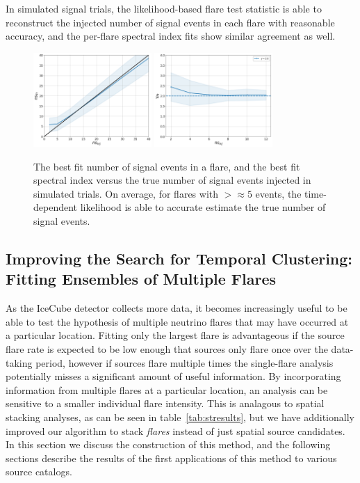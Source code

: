 In simulated signal trials, the likelihood-based flare test statistic is able to reconstruct the injected number of signal events in each flare with reasonable accuracy, and the per-flare spectral index fits show similar agreement as well. 

\begin{figure}[h]
\centering
\includegraphics[width=0.4\textwidth]{figs/nsfit.png}
\includegraphics[width=0.4\textwidth]{figs/gamfit_2.0.png}
\caption{The best fit number of signal events in a flare, and the best fit spectral index versus the true number of signal events injected in simulated trials. On average, for flares with $> \approx 5$ events, the time-dependent likelihood is able to accurate estimate the true number of signal events.}
\label{fig:perflare_nsfit}
\end{figure}


\subsection{Improving the Search for Temporal Clustering: Fitting Ensembles of Multiple Flares}
As the IceCube detector collects more data, it becomes increasingly useful to be able to test the hypothesis of multiple neutrino flares that may have occurred at a particular location. Fitting only the largest flare is advantageous if the source flare rate is expected to be low enough that sources only flare once over the data-taking period, however if sources flare multiple times the single-flare analysis potentially misses a significant amount of useful information. \color{red}By incorporating information from multiple flares at a particular location, an analysis can be sensitive to a smaller individual flare intensity. This is analagous to spatial stacking analyses, as can be seen in table~\ref{tab:stresults}, but we have additionally improved our algorithm to stack \textit{flares} instead of just spatial source candidates. In this section we discuss the construction of this method, and the following sections describe the results of the first applications of this method to various source catalogs. \color{black}

